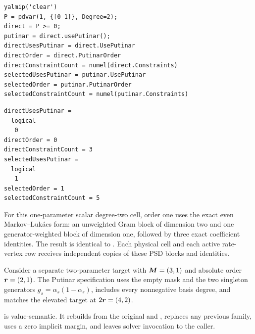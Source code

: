 \examplehead
\begin{lstlisting}[style=dpmatlab]
yalmip('clear')
P = pdvar(1, {[0 1]}, Degree=2);
direct = P >= 0;
putinar = direct.usePutinar();
directUsesPutinar = direct.UsePutinar
directOrder = direct.PutinarOrder
directConstraintCount = numel(direct.Constraints)
selectedUsesPutinar = putinar.UsePutinar
selectedOrder = putinar.PutinarOrder
selectedConstraintCount = numel(putinar.Constraints)
\end{lstlisting}

\begin{lstlisting}[style=dpoutput]
directUsesPutinar =
  logical
   0
directOrder = 0
directConstraintCount = 3
selectedUsesPutinar =
  logical
   1
selectedOrder = 1
selectedConstraintCount = 5
\end{lstlisting}

For this one-parameter scalar degree-two cell, order one uses the exact even Markov--Luk\'acs form: an unweighted Gram block of dimension two and one generator-weighted block of dimension one, followed by three exact coefficient identities.  The result is identical to .  Each physical cell and each active rate-vertex row receives independent copies of these PSD blocks and identities.

 Consider a separate two-parameter target with $\boldsymbol{M}=(3,1)$ and absolute order $\boldsymbol{r}=(2,1)$. The Putinar specification uses the empty mask and the two singleton generators $g_s=\alpha_s(1-\alpha_s)$, includes every nonnegative basis degree, and matches the elevated target at $2\boldsymbol{r}=(4,2)$.
\begin{center}
\end{center}

 is value-semantic. It rebuilds from the original  and , replaces any previous family, uses a zero implicit margin, and leaves solver invocation to the caller.

